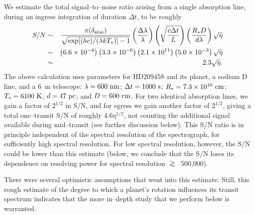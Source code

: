 \documentclass[12pt,preprint]{aastex}
\def\gsim{\;\rlap{\lower 2.5pt
 \hbox{$\sim$}}\raise 1.5pt\hbox{$>$}\;}
\begin{document}
We estimate the total signal--to--noise ratio arising from a single
absorption line, during an ingress integration of duration $\Delta t$, to be
roughly
\begin{eqnarray}
\nonumber S/N & \sim & \frac{\pi(\delta_{\rm atm})}{\sqrt{\exp[(h c)/(\lambda k T_*)] -1}} \left( \frac{ \Delta \lambda}{\lambda} \right) \left( \sqrt{\frac{c \Delta t}{ L}} \right) \left( \frac{R_* D}{d \lambda} \right) \sqrt{\eta} \\
\nonumber & \sim & \left( 6.6\times 10^{-4} \right) \left( 3.3\times 10^{-6} \right) \left( 2.1\times 10^{11} \right) \left( 5.0\times 10^{-3} \right) \sqrt{\eta} \\
\label{eq:SN estimate} & \sim & 2.3 \sqrt{\eta}.
\end{eqnarray}
The above calculation uses parameters for HD209458 and its planet, a
sodium D line, and a 6~m telescope:
$\lambda = 600 {\rm~nm}$; $\Delta t = 1000 {\rm~s}$;
$R_* = 7.3\times 10^{10} {\rm~cm}$;
$T_* = 6100 {\rm ~K}$, $d = 47 {\rm~pc}$;
and $D = 600 {\rm~cm}$.  For two identical
absorption lines, we gain a factor of $2^{1/2}$ in S/N, and for egress we gain
another factor of $2^{1/2}$, giving a total one--transit S/N of roughly
$4.6 \eta^{1/2}$, not counting the additional signal available during
mid--transit (see further discussion below).  This S/N ratio is in principle
independent of the spectral resolution of the spectrograph, for sufficiently
high spectral resolution.  For low spectral resolution, however, the S/N could
be lower than this estimate (below, we conclude that the S/N loses its
dependence on resolving power for spectral resolution $\gsim$~500,000).

There were several optimistic assumptions that went into this estimate.
Still, this rough estimate of the degree to which a planet's rotation
influences its transit spectrum indicates that the more in--depth study
that we perform below is warranted.
\end{document}
